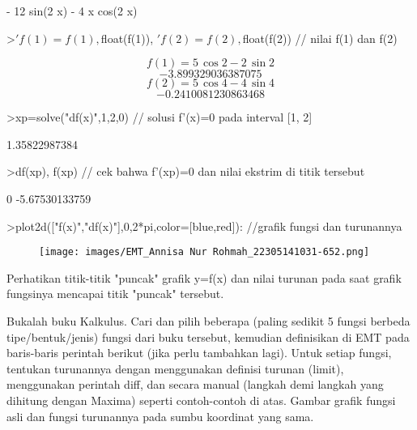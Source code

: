 \documentclass[a4paper,10pt]{article}
\begin{document}
\begin{eulernotebook}
\begin{euleroutput}
                       - 12 sin(2 x) - 4 x cos(2 x)
  
\end{euleroutput}
\begin{eulerprompt}
>$'f(1)=f(1), $float(f(1)), $'f(2)=f(2), $float(f(2)) // nilai f(1) dan f(2)
\end{eulerprompt}
\begin{eulerformula}
\[
 f\left(1\right)=5\,\cos 2-2\,\sin 2
\]
\[
 -3.899329036387075
\]
\[
 f\left(2\right)=5\,\cos 4-4\,\sin 4
\]
\[
-0.2410081230863468
\]
\end{eulerformula}
\begin{eulerprompt}
>xp=solve("df(x)",1,2,0) // solusi f'(x)=0 pada interval [1, 2]
\end{eulerprompt}
\begin{euleroutput}
  1.35822987384
\end{euleroutput}
\begin{eulerprompt}
>df(xp), f(xp) // cek bahwa f'(xp)=0 dan nilai ekstrim di titik tersebut
\end{eulerprompt}
\begin{euleroutput}
  0
  -5.67530133759
\end{euleroutput}
\begin{eulerprompt}
>plot2d(["f(x)","df(x)"],0,2*pi,color=[blue,red]): //grafik fungsi dan turunannya
\end{eulerprompt}
\begin{figure}[h]
    \centering
    \texttt{[image: images/EMT\_Annisa Nur Rohmah\_22305141031-652.png]}
\end{figure}
\begin{eulercomment}
Perhatikan titik-titik "puncak" grafik y=f(x) dan nilai turunan pada
saat grafik fungsinya mencapai titik "puncak" tersebut.
\end{eulercomment}
\begin{eulercomment}
Bukalah buku Kalkulus. Cari dan pilih beberapa (paling sedikit 5
fungsi berbeda tipe/bentuk/jenis) fungsi dari buku tersebut, kemudian
definisikan di EMT pada baris-baris perintah berikut (jika perlu
tambahkan lagi). Untuk setiap fungsi, tentukan turunannya dengan
menggunakan definisi turunan (limit), menggunakan perintah diff, dan
secara manual (langkah demi langkah yang dihitung dengan Maxima)
seperti contoh-contoh di atas. Gambar grafik fungsi asli dan fungsi
turunannya pada sumbu koordinat yang sama.
\end{eulercomment}
\begin{eulerprompt}

\end{eulerprompt}
\end{eulernotebook}
\end{document}

